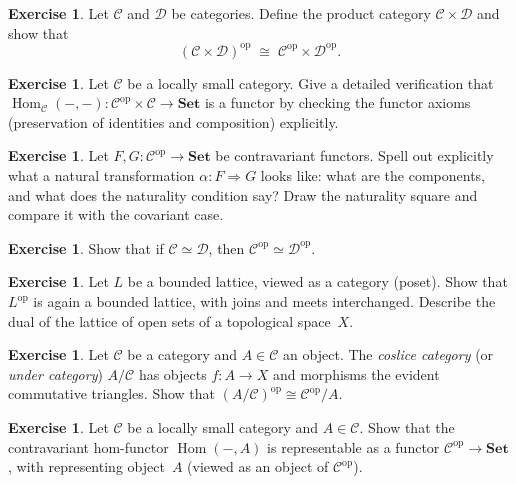 \documentclass[a4paper,12pt]{book}
\DeclareMathOperator{\Hom}{Hom}
\newcommand{\Set}{\mathbf{Set}}
\newcommand{\op}{\mathrm{op}}
\theoremstyle{definition}
\newtheorem{exercise}[definition]{Exercise}
\theoremstyle{plain}
\theoremstyle{remark}
\begin{document}
\begin{exercise}\label{exo:product-category}
Let $\mathcal{C}$ and $\mathcal{D}$ be categories.
Define the product category $\mathcal{C}\times\mathcal{D}$ and show that
\[
    (\mathcal{C}\times\mathcal{D})^{\op}
    \;\cong\;
    \mathcal{C}^{\op}\times\mathcal{D}^{\op}.
\]
\end{exercise}

\begin{exercise}\label{exo:hom-bifunctor-verification}
Let $\mathcal{C}$ be a locally small category.
Give a detailed verification that
$\Hom_\mathcal{C}(-,-)\colon\mathcal{C}^{\op}\times\mathcal{C}\to\Set$
is a functor by checking the functor axioms (preservation of identities
and composition) explicitly.
\end{exercise}

\begin{exercise}\label{exo:contravariant-nat-trans}
Let $F,G\colon\mathcal{C}^{\op}\to\Set$ be contravariant functors.
Spell out explicitly what a natural transformation
$\alpha\colon F\Rightarrow G$ looks like: what are the components, and
what does the naturality condition say?
Draw the naturality square and compare it with the covariant case.
\end{exercise}

\begin{exercise}\label{exo:op-preserves-equivalence}
Show that if $\mathcal{C}\simeq\mathcal{D}$, then
$\mathcal{C}^{\op}\simeq\mathcal{D}^{\op}$.
\end{exercise}

\begin{exercise}\label{exo:concrete-duality-exploration}
Let $L$ be a bounded lattice, viewed as a category (poset).
Show that $L^{\op}$ is again a bounded lattice, with joins and meets
interchanged.  Describe the dual of the lattice of open sets of a
topological space~$X$.
\end{exercise}

\begin{exercise}\label{exo:op-slice}
Let $\mathcal{C}$ be a category and $A\in\mathcal{C}$ an object.
The \emph{coslice category} (or \emph{under category}) $A/\mathcal{C}$
has objects $f\colon A\to X$ and morphisms the evident commutative
triangles.
Show that $(A/\mathcal{C})^{\op}\cong\mathcal{C}^{\op}/A$.
\end{exercise}

\begin{exercise}\label{exo:representable-dual}
Let $\mathcal{C}$ be a locally small category and $A\in\mathcal{C}$.
Show that the contravariant hom-functor $\Hom(-,A)$ is representable
as a functor $\mathcal{C}^{\op}\to\Set$, with representing object~$A$
(viewed as an object of $\mathcal{C}^{\op}$).
\end{exercise}

\end{document}
